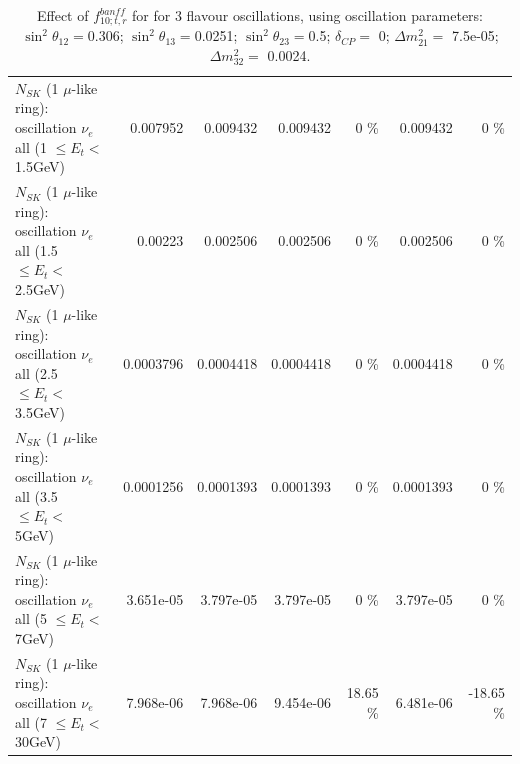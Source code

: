 \begin{table}
\begin{tabular}{| l | r | r | r  r | r  r |}
$N_{SK}$ (1 $\mu$-like ring): oscillation $\nu_{e}$ all (1 $\leq E_{t} <$ 1.5GeV) &        0.007952 &        0.009432 &        0.009432 &        0 \%  &        0.009432 &        0 \%  \\ 
$N_{SK}$ (1 $\mu$-like ring): oscillation $\nu_{e}$ all (1.5 $\leq E_{t} <$ 2.5GeV) &         0.00223 &        0.002506 &        0.002506 &        0 \%  &        0.002506 &        0 \%  \\ 
$N_{SK}$ (1 $\mu$-like ring): oscillation $\nu_{e}$ all (2.5 $\leq E_{t} <$ 3.5GeV) &       0.0003796 &       0.0004418 &       0.0004418 &        0 \%  &       0.0004418 &        0 \%  \\ 
$N_{SK}$ (1 $\mu$-like ring): oscillation $\nu_{e}$ all (3.5 $\leq E_{t} <$ 5GeV) &       0.0001256 &       0.0001393 &       0.0001393 &        0 \%  &       0.0001393 &        0 \%  \\ 
 $N_{SK}$ (1 $\mu$-like ring): oscillation $\nu_{e}$ all (5 $\leq E_{t} <$ 7GeV) &       3.651e-05 &       3.797e-05 &       3.797e-05 &        0 \%  &       3.797e-05 &        0 \%  \\ 
$N_{SK}$ (1 $\mu$-like ring): oscillation $\nu_{e}$ all (7 $\leq E_{t} <$ 30GeV) &       7.968e-06 &       7.968e-06 &       9.454e-06 &    18.65 \%  &       6.481e-06 &   -18.65 \%  \\ 
\hline
\hline
\end{tabular}
\caption{ Effect of $f_{10; t, r}^{banff}$ for for 3 flavour oscillations, using oscillation parameters:  $\sin^2\theta_{12} = $0.306; $\sin^2\theta_{13} = $0.0251; $\sin^2\theta_{23} = $0.5; $\delta_{CP} = $        0; $\Delta m^2_{21} = $    7.5e-05; $\Delta m^2_{32} = $    0.0024. }
\label{tab:num_banff_10_1RmuT_3f_osc_t13:0.0251}
\end{table}
\clearpage
